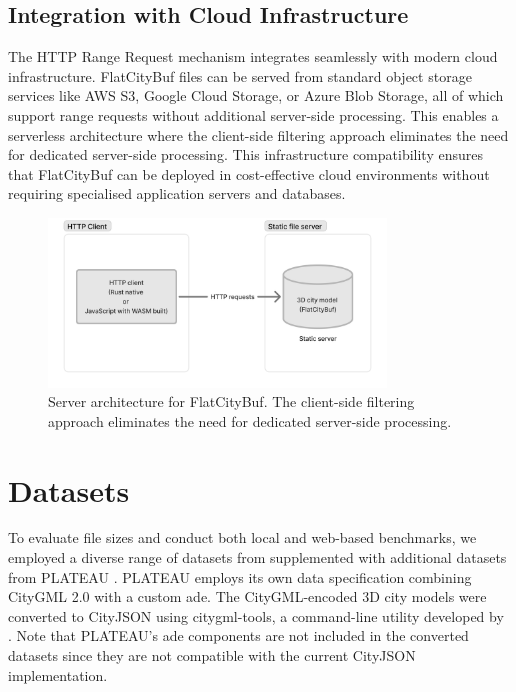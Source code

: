 \subsection{Integration with Cloud Infrastructure}
\label{methodology:http_range_requests:cloud_integration}

The HTTP Range Request mechanism integrates seamlessly with modern cloud infrastructure. FlatCityBuf files can be served from standard object storage services like AWS S3, Google Cloud Storage, or Azure Blob Storage, all of which support range requests without additional server-side processing. This enables a serverless architecture where the client-side filtering approach eliminates the need for dedicated server-side processing. This infrastructure compatibility ensures that FlatCityBuf can be deployed in cost-effective cloud environments without requiring specialised application servers and databases.

\begin{figure}[ht]
  \centering
  \includegraphics[width=0.8\textwidth]{figs/result_analysis/server_architecture_fcb.png}
  \caption{Server architecture for FlatCityBuf. The client-side filtering approach eliminates the need for dedicated server-side processing.}
  \label{fig:result:cross_platform_implementation:server_architecture}
\end{figure}
\section{Datasets}
\label{result:dataset}

To evaluate file sizes and conduct both local and web-based benchmarks, we employed a diverse range of datasets from \citet{ledoux_2024} supplemented with additional datasets from PLATEAU \citep{plateau}. PLATEAU employs its own data specification combining CityGML 2.0 \citep{CityGML} with a custom \ac{ade}. The CityGML-encoded 3D city models were converted to CityJSON using citygml-tools, a command-line utility developed by \citet{citygml_tools}. Note that PLATEAU's \ac{ade} components are not included in the converted datasets since they are not compatible with the current CityJSON implementation.

